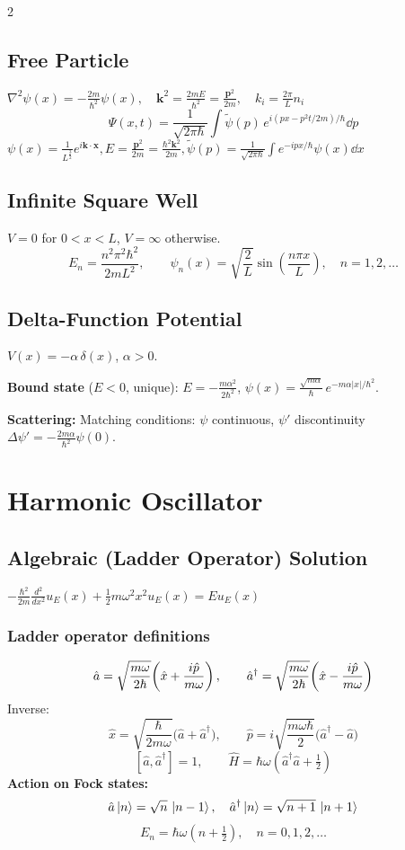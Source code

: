 \documentclass[9pt,a4paper]{article} %
\newcommand{\Hhat}{\hat{H}}
\newcommand{\phat}{\hat{p}}
\newcommand{\xhat}{\hat{x}}
\newcommand{\aop}{\hat{a}}
\newcommand{\adop}{\hat{a}^\dagger}
\begin{document}
\begin{multicols}{2}
\subsection{Free Particle}
$\nabla^2\psi(x)=-\frac{2m}{\hbar^2}\psi(x),\quad  \mathbf{k}^2=\frac{2mE}{\hbar^2}=\frac{\mathbf{p}^2}{2m},\quad k_i=\frac{2\pi}{L}n_i$
\[
\Psi(x,t)=\frac{1}{\sqrt{2\pi\hbar}}\int\tilde{\psi}(p)\,e^{i(px-p^2 t/2m)/\hbar}\dd{p}
\]
$ \psi(x)=\frac{1}{L^{\frac{3}{2}}}e^{i\mathbf{k}\cdot \mathbf{x}} , E=\frac{\mathbf{p}^2}{2m}=\frac{\hbar^2 \mathbf{k}^2 }{2m}, \tilde{\psi}(p)=\frac{1}{\sqrt{2\pi\hbar}}\int e^{-ipx/\hbar}\psi(x)\dd{x} $

\subsection{Infinite Square Well}
$V=0$ for $0<x<L$, $V=\infty$ otherwise.
\[
E_n=\frac{n^2\pi^2\hbar^2}{2mL^2},\qquad \psi_n(x)=\sqrt{\frac{2}{L}}\sin\!\left(\frac{n\pi x}{L}\right),\quad n=1,2,\ldots
\]

\subsection{Delta-Function Potential}
$V(x)=-\alpha\,\delta(x)$, $\alpha>0$.

\textbf{Bound state} ($E<0$, unique):
$E=-\frac{m\alpha^2}{2\hbar^2}$,\; $\psi(x)=\frac{\sqrt{m\alpha}}{\hbar}\,e^{-m\alpha|x|/\hbar^2}$.

\textbf{Scattering:} Matching conditions: $\psi$ continuous, $\psi'$ discontinuity $\Delta\psi'=-\frac{2m\alpha}{\hbar^2}\psi(0)$.

\section{Harmonic Oscillator}

\subsection{Algebraic (Ladder Operator) Solution}
$- \frac{\hbar^2}{2m} \frac{d^2}{dx^2} u_E(x)
+ \frac{1}{2} m \omega^2 x^2 u_E(x)
= E u_E(x)$

\subsubsection{Ladder operator definitions}
\[
\\ \hat{a}=\sqrt{\frac{m\omega}{2\hbar}}\!\left(\xhat+\frac{i\phat}{m\omega}\right),\qquad
\adop=\sqrt{\frac{m\omega}{2\hbar}}\!\left(\xhat-\frac{i\phat}{m\omega}\right)
\]
Inverse:
\[
\xhat=\sqrt{\frac{\hbar}{2m\omega}}\bigl(\aop+\adop\bigr),\qquad
\phat=i\sqrt{\frac{m\omega\hbar}{2}}\bigl(\adop-\aop\bigr)
\]
\[
[\aop,\adop]=1,\qquad \Hhat=\hbar\omega\!\left(\adop\aop+\tfrac{1}{2}\right)
\]
\textbf{Action on Fock states:}
\[
\aop\ket{n}=\sqrt{n}\,\ket{n-1},\quad \adop\ket{n}=\sqrt{n+1}\,\ket{n+1}
\]
\[
E_n=\hbar\omega\!\left(n+\tfrac{1}{2}\right),\quad n=0,1,2,\ldots
\]


\end{multicols}
\end{document}
